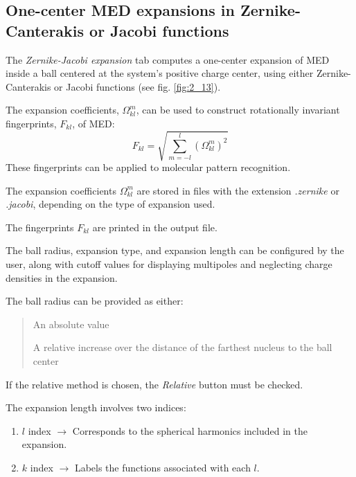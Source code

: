 \documentclass[10pt]{article}
\begin{document}
\subsection{One-center MED expansions in Zernike-Canterakis or Jacobi functions \label{sec:2.13}}

The {\it Zernike-Jacobi expansion} tab computes a one-center expansion
of MED inside a ball centered at the system's positive charge center,
using either Zernike-Canterakis or Jacobi functions (see fig. \ref{fig:2_13}).

The expansion coefficients, $\Omega_{kl}^m$,
can be used to construct rotationally invariant fingerprints, $F_{kl}$, of MED:
% 
$$ 
F_{kl} = \sqrt{ \sum_{m=-l}^l (\Omega_{kl}^m)^2 } 
$$
%
These fingerprints can be applied to molecular pattern recognition.

The expansion coefficients $\Omega_{kl}^m$ are stored in files
with the extension {\it .zernike} or {\it .jacobi},
depending on the type of expansion used.

The fingerprints $F_{kl}$ are printed in the output file.

The ball radius, expansion type, and expansion length can be configured by the user,
along with cutoff values for displaying multipoles and neglecting charge densities in the expansion.

\begin{itemize}
\item The ball radius can be provided as either:
\vspace*{-5mm}
\begin{quote}
\item An absolute value
\item A relative increase over the distance of the farthest nucleus to the ball center
\end{quote}

\item If the relative method is chosen, the {\it Relative} button must be checked.
\end{itemize}

The expansion length involves two indices:

\begin{enumerate}
\item $l$ index $\rightarrow$ Corresponds to the spherical harmonics included in the expansion.
\item $k$ index $\rightarrow$ Labels the functions associated with each $l$.
\end{enumerate}
\end{document}
